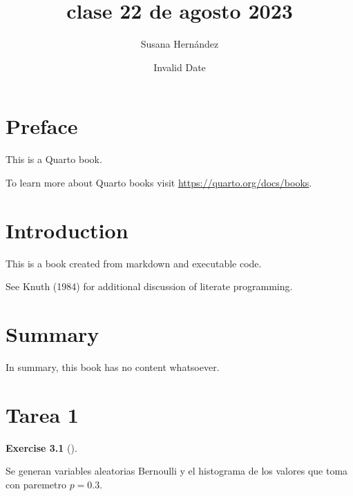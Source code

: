 \documentclass[
  letterpaper,
  DIV=11,
  numbers=noendperiod]{scrreprt}
\title{clase 22 de agosto 2023}
\author{Susana Hernández}
\date{Invalid Date}
\renewcommand*\contentsname{Table of contents}
\newcommand\contentsname{Table of contents}
\theoremstyle{plain}
\theoremstyle{definition}
\newtheorem{exercise}{Exercise}[chapter]
\theoremstyle{remark}
\begin{document}
\maketitle
\ifdefined\Shaded\renewenvironment{Shaded}{\begin{tcolorbox}[interior hidden, sharp corners, borderline west={3pt}{0pt}{shadecolor}, enhanced, boxrule=0pt, frame hidden, breakable]}{\end{tcolorbox}}\fi

\renewcommand*\contentsname{Table of contents}
{
\hypersetup{linkcolor=}
\setcounter{tocdepth}{2}
\tableofcontents
}

\hypertarget{preface}{%
\chapter*{Preface}\label{preface}}


This is a Quarto book.

To learn more about Quarto books visit
\url{https://quarto.org/docs/books}.


\hypertarget{introduction}{%
\chapter{Introduction}\label{introduction}}

This is a book created from markdown and executable code.

See Knuth (1984) for additional discussion of literate programming.


\hypertarget{summary}{%
\chapter{Summary}\label{summary}}

In summary, this book has no content whatsoever.


\hypertarget{tarea-1}{%
\chapter{Tarea 1}\label{tarea-1}}

\begin{exercise}[]\protect\hypertarget{exr-1}{}\label{exr-1}

Se generan variables aleatorias Bernoulli y el histograma de los valores
que toma con paremetro \(p=0.3\).

\end{exercise}
\end{document}
